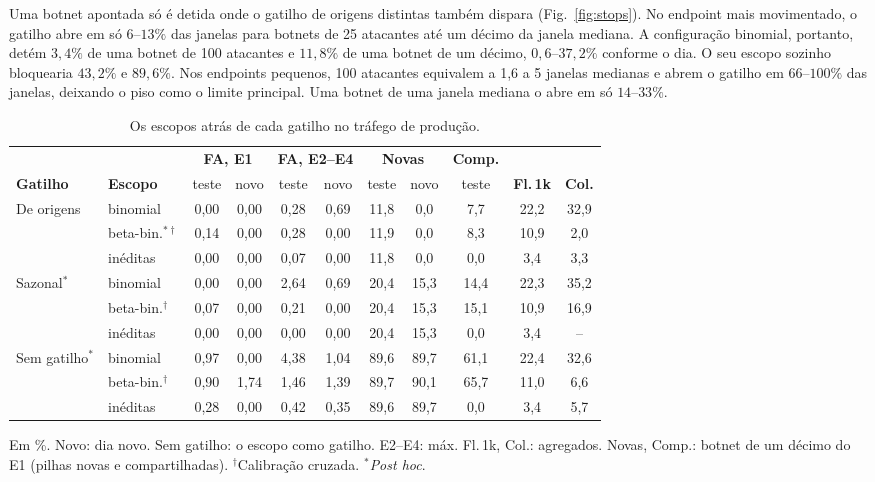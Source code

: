 \documentclass[conference,letterpaper,10pt]{IEEEtran}
\newcommand\1{\textit{(i)}}
\newcommand\2{\textit{(ii)}}
\newcommand\3{\textit{(iii)}}
\begin{document}
Uma botnet apontada só é detida onde o gatilho de origens distintas também dispara (Fig.~\ref{fig:stops}). No endpoint mais movimentado, o gatilho abre em só $6$--$13\%$ das janelas para botnets de 25 atacantes até um décimo da janela mediana. A configuração binomial, portanto, detém $3{,}4\%$ de uma botnet de 100 atacantes e $11{,}8\%$ de uma botnet de um décimo, $0{,}6$--$37{,}2\%$ conforme o dia. O seu escopo sozinho bloquearia $43{,}2\%$ e $89{,}6\%$. Nos endpoints pequenos, 100 atacantes equivalem a 1,6 a 5 janelas medianas e abrem o gatilho em $66$--$100\%$ das janelas, deixando o piso como o limite principal. Uma botnet de uma janela mediana o abre em só $14$--$33\%$.

\begin{table}[t]
\centering
\caption{Os escopos atrás de cada gatilho no tráfego de produção.}
\label{tab:triggers}
\scriptsize
\setlength{\tabcolsep}{1.6pt}
\begin{tabular}{@{}llccccccccc@{}}
\toprule
 & & \multicolumn{2}{c}{\textbf{FA, E1}} & \multicolumn{2}{c}{\textbf{FA, E2--E4}} & \multicolumn{2}{c}{\textbf{Novas}} & \textbf{Comp.} & & \\
\cmidrule(lr){3-4}\cmidrule(lr){5-6}\cmidrule(lr){7-8}\cmidrule(lr){9-9}
\textbf{Gatilho} & \textbf{Escopo} & teste & novo & teste & novo & teste & novo & teste & \textbf{Fl.\,1k} & \textbf{Col.} \\
\midrule
De origens          & binomial               & 0,00 & 0,00 & 0,28 & 0,69 & 11,8 & 0,0  & 7,7  & 22,2 & 32,9 \\
                    & beta-bin.$^{*\dagger}$ & 0,14 & 0,00 & 0,28 & 0,00 & 11,9 & 0,0  & 8,3  & 10,9 & 2,0 \\
                    & inéditas               & 0,00 & 0,00 & 0,07 & 0,00 & 11,8 & 0,0  & 0,0  & 3,4  & 3,3 \\
\rowcolor[gray]{0.90}
Sazonal$^{*}$       & binomial               & 0,00 & 0,00 & 2,64 & 0,69 & 20,4 & 15,3 & 14,4 & 22,3 & 35,2 \\
\rowcolor[gray]{0.90}
                    & beta-bin.$^{\dagger}$  & 0,07 & 0,00 & 0,21 & 0,00 & 20,4 & 15,3 & 15,1 & 10,9 & 16,9 \\
\rowcolor[gray]{0.90}
                    & inéditas               & 0,00 & 0,00 & 0,00 & 0,00 & 20,4 & 15,3 & 0,0  & 3,4  & -- \\
Sem gatilho$^{*}$   & binomial               & 0,97 & 0,00 & 4,38 & 1,04 & 89,6 & 89,7 & 61,1 & 22,4 & 32,6 \\
                    & beta-bin.$^{\dagger}$  & 0,90 & 1,74 & 1,46 & 1,39 & 89,7 & 90,1 & 65,7 & 11,0 & 6,6 \\
                    & inéditas               & 0,28 & 0,00 & 0,42 & 0,35 & 89,6 & 89,7 & 0,0  & 3,4  & 5,7 \\
\bottomrule
\end{tabular}

\vspace{2pt}
{\footnotesize Em \%. Novo: dia novo. Sem gatilho: o escopo como gatilho. E2--E4: máx. Fl.\,1k, Col.: agregados. Novas, Comp.: botnet de um décimo do E1 (pilhas novas e compartilhadas). $^{\dagger}$Calibração cruzada. $^{*}$\textit{Post hoc}.}
\end{table}
\end{document}
